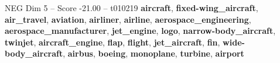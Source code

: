 \begin{textsample}{NEG Dim 5 – Score -21.00 – t010219}  \label{ex:f5_neg_010}
\textbf{aircraft}, \textbf{fixed-wing\_aircraft}, \textbf{air\_travel}, \textbf{aviation}, \textbf{airliner}, \textbf{airline}, \textbf{aerospace\_engineering}, \textbf{aerospace\_manufacturer}, \textbf{jet\_engine}, \textbf{logo}, \textbf{narrow-body\_aircraft}, \textbf{twinjet}, \textbf{aircraft\_engine}, \textbf{flap}, \textbf{flight}, \textbf{jet\_aircraft}, \textbf{fin}, \textbf{wide-body\_aircraft}, \textbf{airbus}, \textbf{boeing}, \textbf{monoplane}, \textbf{turbine}, \textbf{airport}

\end{textsample}
